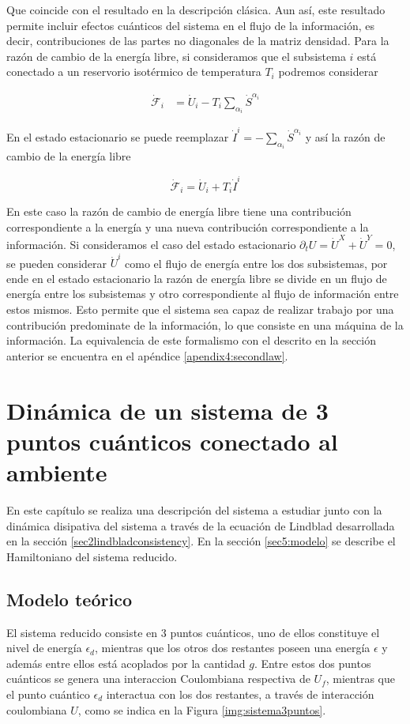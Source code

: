 Que coincide con el resultado en la descripción clásica. Aun así, este resultado permite incluir efectos cuánticos del sistema en el flujo de la información, es decir, contribuciones de las partes no diagonales de la matriz densidad. Para la razón de cambio de la energía libre, si consideramos que el subsistema $i$ está conectado a un reservorio isotérmico de temperatura $T_{i}$ podremos considerar

\begin{align*}
    \dot{\mathcal{F}}_{i} & = \dot{U}_{i} - T_{i} \sum_{\alpha_{i}}\dot{S}^{\alpha_{i}} 
\end{align*}

En el estado estacionario se puede reemplazar $\dot{I}^{i} = - \sum_{\alpha_{i}}\dot{S}^{\alpha_{i}}$ y así la razón de cambio de la energía libre

\begin{equation*}
    \dot{\mathcal{F}}_{i} = \dot{U}_{i} + T_{i} \dot{I}^{i}
\end{equation*}

En este caso la razón de cambio de energía libre tiene una contribución correspondiente a la energía y una nueva contribución correspondiente a la información. Si consideramos el caso del estado estacionario $\partial_{t}U = \dot{U}^{X} + \dot{U}^{Y} = 0$, se pueden considerar $\dot{U}^{i}$ como el flujo de energía entre los dos subsistemas, por ende en el estado estacionario la razón de energía libre se divide en un flujo de energía entre los subsistemas y otro correspondiente al flujo de información entre estos mismos. Esto permite que el sistema sea capaz de realizar trabajo por una contribución predominate de la información, lo que consiste en una máquina de la información. La equivalencia de este formalismo con el descrito en la sección anterior se encuentra en el apéndice \ref{apendix4:secondlaw}.


\chapter{Dinámica de un sistema de 3 puntos cuánticos conectado al ambiente}
En este capítulo se realiza una descripción del sistema a estudiar junto con la dinámica disipativa del sistema a través de la ecuación de Lindblad desarrollada en la sección \ref{sec2lindbladconsistency}. En la sección \ref{sec5:modelo} se describe el Hamiltoniano del sistema reducido.  

\section{Modelo teórico}
El sistema reducido consiste en 3 puntos cuánticos, uno de ellos constituye el nivel de energía $\epsilon_{d}$, mientras que los otros dos restantes poseen una energía $\epsilon$ y además entre ellos está acoplados por la cantidad $g$. Entre estos dos puntos cuánticos se genera una interaccion Coulombiana respectiva de $U_{f}$, mientras que el punto cuántico $\epsilon_{d}$ interactua con los dos restantes, a través de interacción coulombiana $U$, como se indica en la Figura \ref{img:sistema3puntos}.


